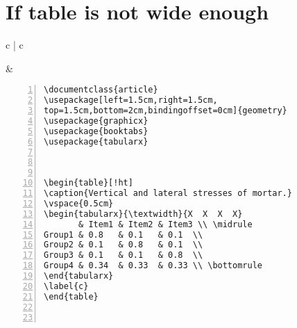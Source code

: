\section{If table is not wide enough}
\begin{tabular}{c | c}
\begin{minipage}[m]{0.4\textwidth}
\end{minipage}
&
\begin{minipage}[m]{0.55\textwidth}
\renewcommand\textminus{\mbox{-}}%
\begin{lstlisting}[numberstyle=\zebra{green!15}{yellow!15},numbers=left,basicstyle=\footnotesize] 
\documentclass{article}
\usepackage[left=1.5cm,right=1.5cm,
top=1.5cm,bottom=2cm,bindingoffset=0cm]{geometry}
\usepackage{graphicx}
\usepackage{booktabs}
\usepackage{tabularx}


           
\begin{table}[!ht] 
\caption{Vertical and lateral stresses of mortar.}  
\vspace{0.5cm}
\begin{tabularx}{\textwidth}{X  X  X  X}
       & Item1 & Item2 & Item3 \\ \midrule
Group1 & 0.8   & 0.1   & 0.1  \\
Group2 & 0.1   & 0.8   & 0.1  \\
Group3 & 0.1   & 0.1   & 0.8  \\
Group4 & 0.34  & 0.33  & 0.33 \\ \bottomrule
\end{tabularx}
\label{c}
\end{table}

        
\end{lstlisting}
\end{minipage}
\end{tabular}



